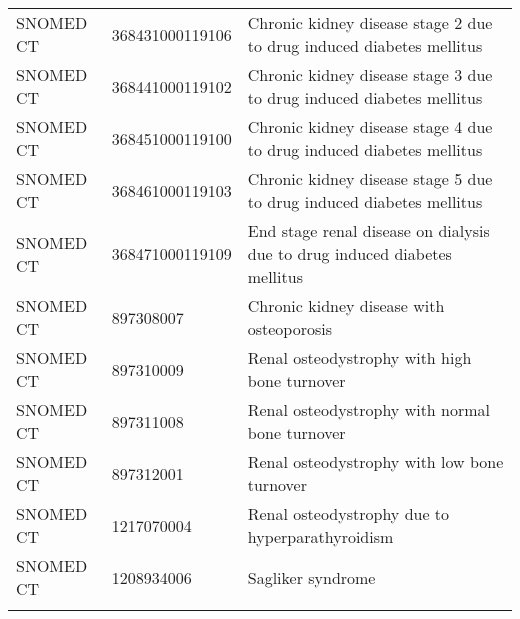 \begin{longtable}{p{}p{}p{}}
  SNOMED CT & 368431000119106 & Chronic kidney disease stage 2 due to drug induced diabetes mellitus \\ 
  SNOMED CT & 368441000119102 & Chronic kidney disease stage 3 due to drug induced diabetes mellitus \\ 
  SNOMED CT & 368451000119100 & Chronic kidney disease stage 4 due to drug induced diabetes mellitus \\ 
  SNOMED CT & 368461000119103 & Chronic kidney disease stage 5 due to drug induced diabetes mellitus \\ 
  SNOMED CT & 368471000119109 & End stage renal disease on dialysis due to drug induced diabetes mellitus \\ 
  SNOMED CT & 897308007 & Chronic kidney disease with osteoporosis \\ 
  SNOMED CT & 897310009 & Renal osteodystrophy with high bone turnover \\ 
  SNOMED CT & 897311008 & Renal osteodystrophy with normal bone turnover \\ 
  SNOMED CT & 897312001 & Renal osteodystrophy with low bone turnover \\ 
  SNOMED CT & 1217070004 & Renal osteodystrophy due to hyperparathyroidism \\ 
  SNOMED CT & 1208934006 & Sagliker syndrome \\ 
  \hline
\label{tab:codes_ckd}
\end{longtable}
